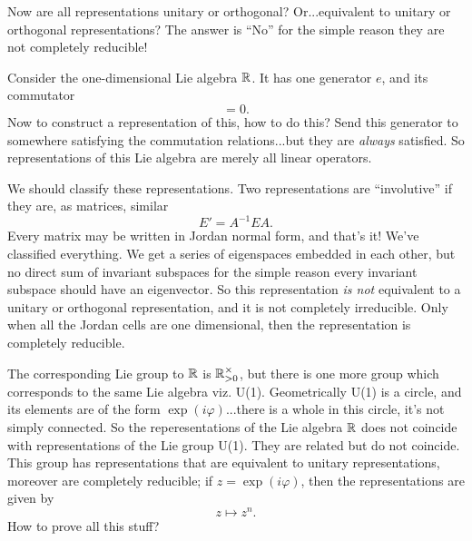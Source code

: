 Now are all representations unitary or orthogonal?
Or...equivalent to unitary or orthogonal representations? The
answer is ``No'' for the simple reason they are not completely
reducible!
\begin{ex}
Consider the one-dimensional Lie algebra $\Bbb{R}$. It has one
generator $e$, and its commutator
\begin{equation}
[e,e] = 0.
\end{equation}
Now to construct a representation of this, how to do this? Send
this generator to somewhere satisfying the commutation
relations...but they are \emph{always} satisfied. So
representations of this Lie algebra are merely all linear operators.
\end{ex}
We should classify these representations. Two representations are
``involutive'' if they are, as matrices, similar
\begin{equation}
E' = A^{-1}EA.
\end{equation}
Every matrix may be written in Jordan normal form, and that's it!
We've classified everything. We get a series of eigenspaces
embedded in each other, but no direct sum of invariant subspaces
for the simple reason every invariant subspace should have an
eigenvector. So this representation \emph{is not} equivalent to a
unitary or orthogonal representation, and it is not completely
irreducible. Only when all the Jordan cells are one dimensional,
then the representation is completely reducible.

The corresponding Lie group to $\Bbb{R}$ is
$\Bbb{R}^{\times}_{>0}$, but there is one more group which
corresponds to the same Lie algebra viz. U(1). Geometrically U(1)
is a circle, and its elements are of the form
$\exp(i\varphi)$...there is a whole in this circle, it's not
simply connected. So the reperesentations of the Lie algebra
$\Bbb{R}$ does not coincide with representations of the Lie group
U(1). They are related but do not coincide. This group has
representations that are equivalent to unitary representations,
moreover are completely reducible; if $z=\exp(i\varphi)$, then
the representations are given by
\begin{equation}
z\mapsto z^{n}.
\end{equation}
How to prove all this stuff?

